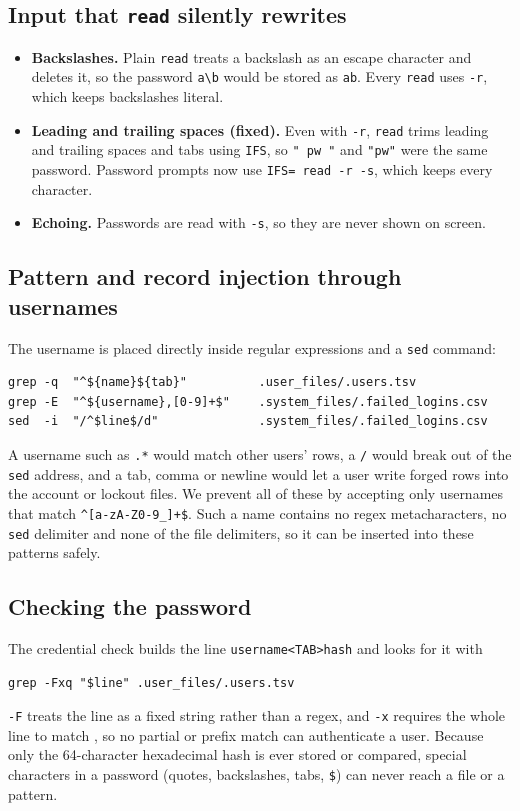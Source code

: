 \documentclass[12pt]{article}
\begin{document}
\subsection{Input that \texttt{read} silently rewrites}
\begin{itemize}
    \item \textbf{Backslashes.} Plain \texttt{read} treats a backslash as an escape character and deletes it, so the password \texttt{a\textbackslash b} would be stored as \texttt{ab}. Every \texttt{read} uses \texttt{-r}, which keeps backslashes literal.
    \item \textbf{Leading and trailing spaces (fixed).} Even with \texttt{-r}, \texttt{read} trims leading and trailing spaces and tabs using \texttt{IFS}, so \texttt{" pw "} and \texttt{"pw"} were the same password. Password prompts now use \texttt{IFS= read -r -s}, which keeps every character.
    \item \textbf{Echoing.} Passwords are read with \texttt{-s}, so they are never shown on screen.
\end{itemize}

\subsection{Pattern and record injection through usernames}
The username is placed directly inside regular expressions and a \texttt{sed} command:
\begin{lstlisting}
grep -q  "^${name}${tab}"          .user_files/.users.tsv
grep -E  "^${username},[0-9]+$"    .system_files/.failed_logins.csv
sed  -i  "/^$line$/d"              .system_files/.failed_logins.csv
\end{lstlisting}
A username such as \texttt{.*} would match other users' rows, a \texttt{/} would break out of the \texttt{sed} address, and a tab, comma or newline would let a user write forged rows into the account or lockout files. We prevent all of these by accepting only usernames that match \texttt{\^{}[a-zA-Z0-9\_]+\$}. Such a name contains no regex metacharacters, no \texttt{sed} delimiter and none of the file delimiters, so it can be inserted into these patterns safely.

\subsection{Checking the password}
The credential check builds the line \texttt{username<TAB>hash} and looks for it with
\begin{lstlisting}
grep -Fxq "$line" .user_files/.users.tsv
\end{lstlisting}
\texttt{-F} treats the line as a fixed string rather than a regex, and \texttt{-x} requires the whole line to match \cite{grep_manual}, so no partial or prefix match can authenticate a user. Because only the 64-character hexadecimal hash is ever stored or compared, special characters in a password (quotes, backslashes, tabs, \texttt{\$}) can never reach a file or a pattern.
\end{document}
